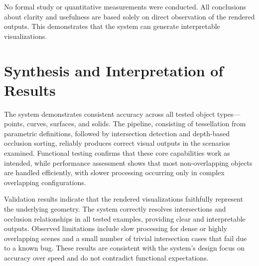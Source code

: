 No formal study or quantitative measurements were conducted. 
All conclusions about clarity and usefulness are based solely on 
direct observation of the rendered outputs. This demonstrates that 
the system can generate interpretable visualizations.



\section{Synthesis and Interpretation of Results}

The system demonstrates consistent accuracy across all tested object 
types---points, curves, surfaces, and solids. The pipeline, 
consisting of tessellation from parametric definitions, followed 
by intersection detection and depth-based occlusion sorting, 
reliably produces correct visual outputs in the scenarios examined. 
Functional testing confirms that these core capabilities work as 
intended, while performance assessment shows that most non-overlapping 
objects are handled efficiently, with slower processing occurring only 
in complex overlapping configurations.

Validation results indicate that the rendered visualizations 
faithfully represent the underlying geometry. The system correctly 
resolves intersections and occlusion relationships in all tested 
examples, providing clear and interpretable outputs. Observed 
limitations include slow processing for dense or highly 
overlapping scenes and a small number of trivial intersection 
cases that fail due to a known bug. These results are consistent 
with the system's design focus on accuracy over speed and do not 
contradict functional expectations.

